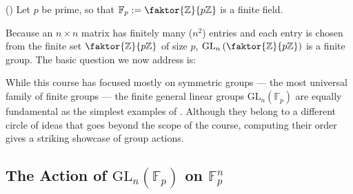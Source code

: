 \begin{content}
() Let $p$ be prime, so that $\mathbb{F}_p := \faktor{\mathbb{Z}}{p\mathbb{Z}}$ is a finite field.


Because an $n \times n$ matrix has finitely many ($n^2$) entries and each entry is chosen from the finite set $\faktor{\mathbb{Z}}{p\mathbb{Z}}$ of size $p$, $\mathrm{GL}_n\left(\faktor{\mathbb{Z}}{p\mathbb{Z}}\right)$ is a finite group. The basic question we now address is:
\end{content}

\begin{insight}
While this course has focused mostly on symmetric groups --- the most universal family of finite groups --- the finite general linear groups $\mathrm{GL}_n(\mathbb{F}_p)$ are equally fundamental as the simplest examples of . Although they belong to a different circle of ideas that goes beyond the scope of the course, computing their order gives a striking showcase of group actions.
\end{insight}

\subsection{The Action of \texorpdfstring{$\mathrm{GL}_n(\mathbb{F}_p)$}{GL\_n(F\_p)} on \texorpdfstring{$\mathbb{F}_p^n$}{F\_p\textasciicircum n}}

